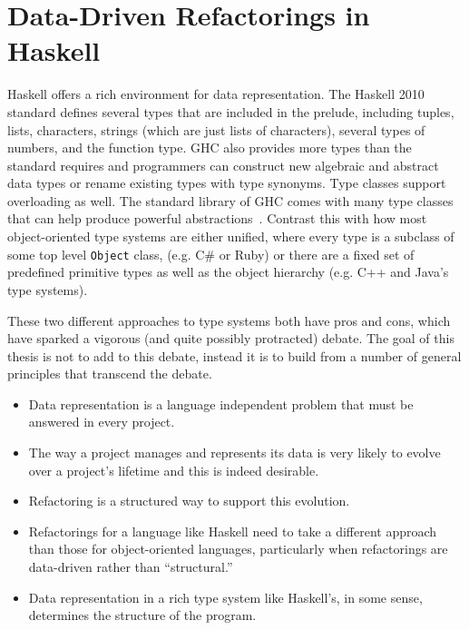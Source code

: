 \section{Data-Driven Refactorings in Haskell}

Haskell offers a rich environment for data representation. The Haskell 2010 standard defines several types that are included in the prelude, including tuples, lists, characters, strings (which are just lists of characters), several types of numbers, and the function type. GHC also provides more types than the standard requires and programmers can construct new algebraic and abstract data types or rename existing types with type synonyms. Type classes support overloading as well. The standard library of GHC comes with many type classes that can help produce powerful abstractions~\citep{typeclassopedia}. Contrast this with how most object-oriented type systems are either unified, where every type is a subclass of some top level \texttt{Object} class, (e.g. C\# or Ruby) or there are a fixed set of predefined primitive types as well as the object hierarchy (e.g. C++ and Java's type systems). 

These two different approaches to type systems both have pros and cons, which have sparked a vigorous (and quite possibly protracted) debate. The goal of this thesis is not to add to this debate, instead it is to build from a number of general principles that transcend the debate.

\begin{itemize}
	\item Data representation is a language independent problem that must be answered in every project.
	\item The way a project manages and represents its data is very likely to evolve over a project's lifetime and this is indeed desirable.
	\item Refactoring is a structured way to support this evolution.
		\item Refactorings for a language like Haskell need to take a different approach than those for object-oriented languages, particularly when refactorings are data-driven rather than ``structural.''  
	\item Data representation in a rich type system like Haskell's, in some sense, determines the structure of the program.
\end{itemize} 


